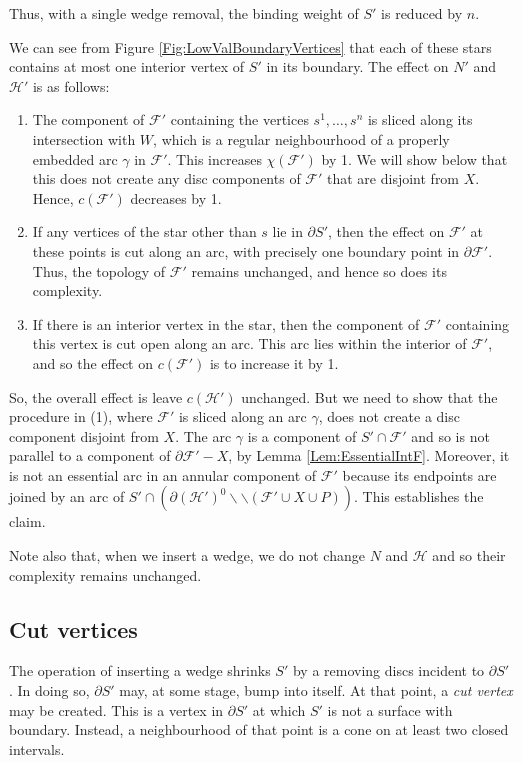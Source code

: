 \documentclass[oneside]{amsart}
\numberwithin{equation}{section}
\theoremstyle{plain}
\theoremstyle{definition}
\newcommand{\cut}{\backslash\backslash}
\newcommand{\calH}{\mathcal{H}}
\newcommand{\calF}{\mathcal{F}}
\begin{document}
Thus, with a single wedge removal, the binding weight of $S'$ is reduced by $n$. 

We can see from Figure \ref{Fig:LowValBoundaryVertices} that each of these stars contains at most one
interior vertex of $S'$ in its boundary. The effect on $N'$ and $\mathcal{H}'$ is as follows:
\begin{enumerate}
\item The component of $\mathcal{F}'$ containing the vertices $s^1, \dots, s^n$ is sliced along its intersection with $W$,
which is a regular neighbourhood of a properly embedded arc $\gamma$ in $\mathcal{F}'$.
This increases $\chi(\mathcal{F}')$ by 1. We will show below that this does not create any disc components of $\mathcal{F}'$
that are disjoint from $X$. Hence, $c(\mathcal{F}')$ decreases by 1.
\item If any vertices of the star other than $s$ lie in $\partial S'$, then the effect on $\mathcal{F}'$
at these points is cut along an arc, with precisely one boundary point in $\partial \mathcal{F}'$.
Thus, the topology of $\mathcal{F}'$ remains unchanged, and hence so does its complexity.
\item If there is an interior vertex in the star, then the component of $\mathcal{F}'$
containing this vertex is cut open along an arc. This arc lies within the interior of $\mathcal{F}'$,
and so the effect on $c(\mathcal{F}')$ is to increase it by 1.
\end{enumerate}
So, the overall effect is leave $c(\mathcal{H}')$ unchanged. But we need to show
that the procedure in (1), where $\mathcal{F}'$ is sliced along an arc $\gamma$, 
does not create a disc component disjoint from $X$. The arc $\gamma$ is a component
of $S' \cap \calF'$ and so is not parallel to a component of $\partial \calF' - X$, by Lemma
\ref{Lem:EssentialIntF}. Moreover, it is not an essential arc in an annular component of
$\calF'$ because its endpoints are joined by an arc of $S' \cap (\partial (\calH')^0 \cut (\calF' \cup X \cup P))$.
This establishes the claim.

Note also that, when we insert a wedge, we do not change $N$ and $\mathcal{H}$
and so their complexity remains unchanged.

\subsection{Cut vertices}
\label{Sec:CutVertices}

The operation of inserting a wedge shrinks $S'$ by a removing discs incident to $\partial S'$. In doing so,
$\partial S'$ may, at some stage, bump into itself. At that point, a \emph{cut vertex} may be created. This is
a vertex in $\partial S'$ at which $S'$ is not a surface with boundary. Instead, a neighbourhood of that
point is a cone on at least two closed intervals.
\end{document}
